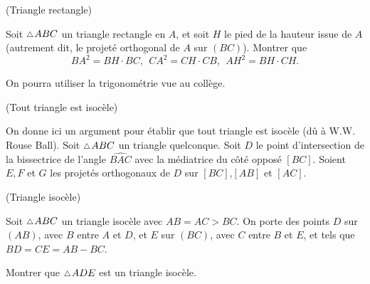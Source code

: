 \documentclass[a4paper,11pt,reqno]{amsart}
\begin{document}
\begin{exo} (Triangle rectangle)

  Soit $\tri ABC$ un triangle rectangle en $A$, et soit $H$ le pied de la hauteur issue de $A$ (autrement dit, le projeté orthogonal de $A$ sur $(BC)$).  Montrer que
  \[
    BA^2=BH \cdot BC,\ \ CA^2=CH \cdot CB,\ \ AH^2=BH \cdot CH.
  \]
  \begin{indication}
    On pourra utiliser la trigonométrie vue au collège.
  \end{indication}
\end{exo}


\begin{exo} (Tout triangle est isocèle)

  On donne ici un argument pour établir que tout triangle est isocèle (dû à W.W. Rouse Ball).
  Soit $\tri ABC$ un triangle quelconque. Soit $D$ le point d'intersection de la bissectrice de l'angle $\widehat{BAC}$ avec la médiatrice du côté opposé $[BC]$. Soient $E,F$ et $G$ les projetés orthogonaux de $D$ sur $[BC]$,$[AB]$ et $[AC]$.\\[-.7\baselineskip]
\end{exo}


\begin{exo} (Triangle isocèle)

  Soit $\tri ABC$ un triangle isocèle avec $AB=AC > BC$. On porte des points $D$ sur $(AB)$, avec $B$ entre $A$ et $D$, et $E$ sur $(BC)$, avec $C$ entre $B$ et $E$, et tels que $BD=CE=AB-BC$.

  Montrer que $\tri ADE$ est un triangle isocèle.
\end{exo}
\end{document}
